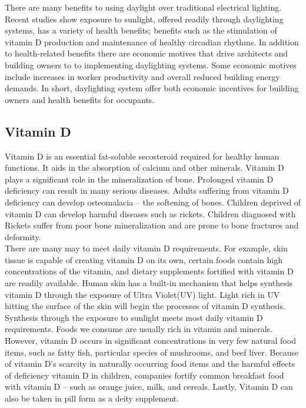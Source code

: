   There are many benefits to using daylight over traditional electrical lighting.
  Recent studies show exposure to sunlight, offered readily through daylighting systems, has a variety of health benefits; benefits such as the stimulation of vitamin D production and maintenance of healthy circadian rhythms.
  In addition to health-related benefits there are economic motives that drive architects and building owners to to implementing daylighting systems.
  Some economic motives include increases in worker productivity and overall reduced building energy demands.
  In short, daylighting system offer both economic incentives for building owners and health benefits for occupants.

  \subsection{Vitamin D}
    Vitamin D is an essential fat-soluble secosteroid required for healthy human functions. It aids in the absorption of calcium and other minerals. Vitamin D plays a significant role in the mineralization of bone\cite{Ross}.   
    Prolonged vitamin D deficiency can result in many serious diseases.
    Adults suffering from vitamin D deficiency can develop osteomalacia -- the softening of bones. Children deprived of vitamin D can develop harmful diseases such as rickets. Children diagnosed with Rickets suffer from poor bone mineralization and are prone to bone fractures and deformity\cite{Pettifor}. \\

    There are many may to meet daily vitamin D requirements. For example, skin tissue is capable of creating vitamin D on its own, certain foods contain high concentrations of the vitamin, and dietary supplements fortified with vitamin D are readily available\cite{Ross}.
    Human skin has a built-in mechanism that helps synthesis vitamin D through the exposure of Ultra Violet(UV) light. Light rich in UV hitting the surface of the skin will begin the processes of vitamin D synthesis. Synthesis through the exposure to sunlight meets most daily vitamin D requirements. Foods we consume are usually rich in vitamin and minerals. However, vitamin D occurs in significant concentrations in very few natural food items, such as fatty fish, particular species of mushrooms, and beef liver.  Because of vitamin D's scarcity in naturally occurring food items and the harmful effects of deficiency vitamin D  in children, companies fortify common breakfast food with vitamin D -- such as orange juice, milk, and cereals. Lastly, Vitamin D can also be taken in pill form as a deity supplement. \\

